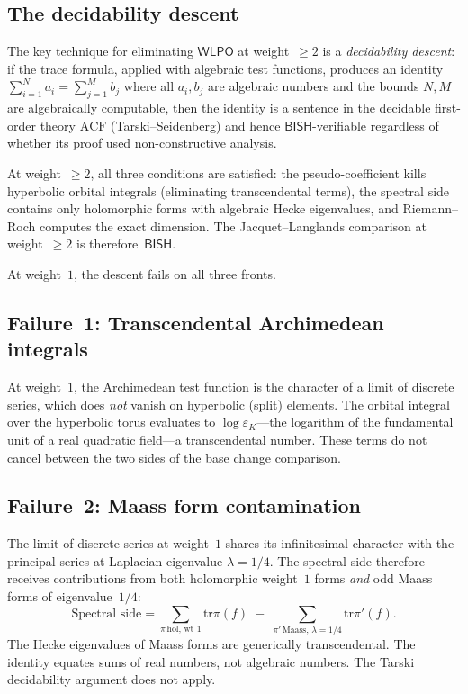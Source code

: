 \documentclass[11pt]{article}
\theoremstyle{plain}
\theoremstyle{definition}
\theoremstyle{remark}
\newcommand{\tr}{\mathrm{tr}}
\newcommand{\BISH}{\mathsf{BISH}}
\newcommand{\WLPO}{\mathsf{WLPO}}
\begin{document}
\subsection{The decidability descent}

The key technique for eliminating $\WLPO$ at weight~$\ge 2$
is a \emph{decidability descent}: if the trace formula, applied
with algebraic test functions, produces an identity
$\sum_{i=1}^N a_i = \sum_{j=1}^M b_j$ where all $a_i, b_j$
are algebraic numbers and the bounds $N, M$ are algebraically
computable, then the identity is a sentence in the decidable
first-order theory $\mathrm{ACF}$ (Tarski--Seidenberg) and
hence $\BISH$-verifiable regardless of whether its proof used
non-constructive analysis.

At weight~$\ge 2$, all three conditions are satisfied: the
pseudo-coefficient kills hyperbolic orbital integrals (eliminating
transcendental terms), the spectral side contains only holomorphic
forms with algebraic Hecke eigenvalues, and Riemann--Roch
computes the exact dimension.  The Jacquet--Langlands comparison
at weight~$\ge 2$ is therefore~$\BISH$.

At weight~$1$, the descent fails on all three fronts.

\subsection{Failure~1: Transcendental Archimedean integrals}

At weight~$1$, the Archimedean test function is the character of
a limit of discrete series, which does \emph{not} vanish on
hyperbolic (split) elements.  The orbital integral over the
hyperbolic torus evaluates to $\log \varepsilon_K$---the logarithm
of the fundamental unit of a real quadratic field---a
transcendental number.  These terms do not cancel between the
two sides of the base change comparison.

\subsection{Failure~2: Maass form contamination}

The limit of discrete series at weight~$1$ shares its
infinitesimal character with the principal series at Laplacian
eigenvalue $\lambda = 1/4$.  The spectral side therefore receives
contributions from both holomorphic weight~$1$ forms \emph{and}
odd Maass forms of eigenvalue~$1/4$:
\[
  \text{Spectral side} = \sum_{\pi \,\text{hol, wt 1}}
  \tr \pi(f) \;-\; \sum_{\pi' \,\text{Maass, }\lambda = 1/4}
  \tr \pi'(f).
\]
The Hecke eigenvalues of Maass forms are generically
transcendental.  The identity equates sums of real numbers,
not algebraic numbers.  The Tarski decidability argument does
not apply.
\end{document}
